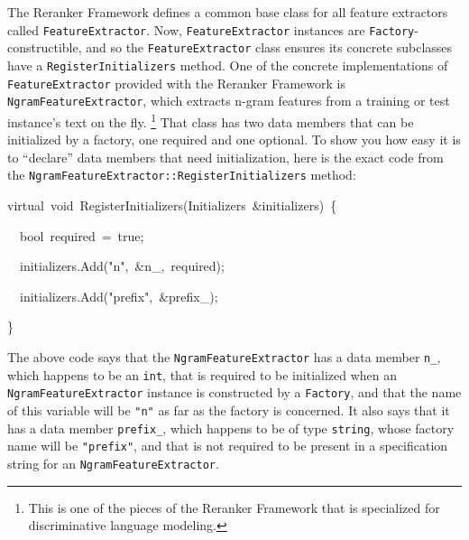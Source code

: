 \documentclass[a4paper]{article}
\let\textquotedbl="
\newenvironment{lyxcode}
{\par\begin{list}{}{
\scriptsize
\setlength{\leftmargin}{0.1in}
\setlength{\rightmargin}{\leftmargin}
\setlength{\listparindent}{0pt}%
\raggedright
\setlength{\itemsep}{0pt}
\setlength{\parsep}{0pt}
\normalfont\ttfamily}%
 \item[]}
{\end{list}}
\begin{document}
The Reranker Framework defines a common base class for all feature
extractors called \texttt{FeatureExtractor}. Now, \texttt{FeatureExtractor}
instances are \texttt{Factory}-constructible, and so the \texttt{FeatureExtractor}
class ensures its concrete subclasses have a \texttt{RegisterInitializers}
method. One of the concrete implementations of \texttt{FeatureExtractor}
provided with the Reranker Framework is \texttt{NgramFeatureExtractor},
which extracts n-gram features from a training or test instance's
text on the fly.%
\footnote{This is one of the pieces of the Reranker Framework that is specialized
for discriminative language modeling.%
} That class has two data members that can be initialized by a factory,
one required and one optional. To show you how easy it is to \textquotedblleft{}declare\textquotedblright{}
data members that need initialization, here is the exact code from
the \texttt{NgramFeatureExtractor::RegisterInitializers} method:
\begin{lyxcode}
\tiny
virtual~void~RegisterInitializers(Initializers~\&initializers)~\{

~~bool~required~=~true;

~~initializers.Add(\textquotedbl{}n\textquotedbl{},~\&n\_,~required);

~~initializers.Add(\textquotedbl{}prefix\textquotedbl{},~\&prefix\_);

\}
\normalsize
\end{lyxcode}
The above code says that the \texttt{NgramFeatureExtractor} has a
data member \texttt{n\_}, which happens to be an \texttt{int}, that
is required to be initialized when an \texttt{NgramFeatureExtractor}
instance is constructed by a \texttt{Factory}, and that the name of
this variable will be \texttt{\textquotedbl{}n\textquotedbl{}} as
far as the factory is concerned. It also says that it has a data member
\texttt{prefix\_}, which happens to be of type \texttt{string}, whose
factory name will be \texttt{\textquotedbl{}prefix\textquotedbl{}},
and that is not required to be present in a specification string for
an \texttt{NgramFeatureExtractor}.
\end{document}
